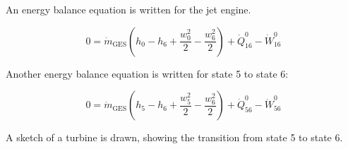 An energy balance equation is written for the jet engine.  

\[
0 = \dot{m}_{\text{GES}} \left( h_0 - h_6 + \frac{w_0^2}{2} - \frac{w_6^2}{2} \right) + \dot{Q}_{16}^0 - \dot{W}_{16}^0
\]

Another energy balance equation is written for state 5 to state 6:  

\[
0 = \dot{m}_{\text{GES}} \left( h_5 - h_6 + \frac{w_5^2}{2} - \frac{w_6^2}{2} \right) + \dot{Q}_{56}^0 - \dot{W}_{56}^0
\]

A sketch of a turbine is drawn, showing the transition from state 5 to state 6.